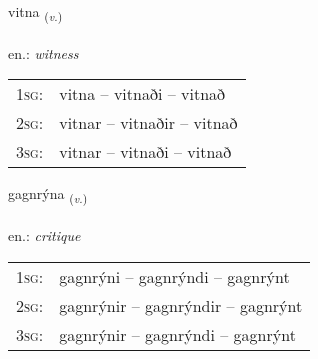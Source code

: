 \documentclass[frontgrid, backgrid]{flacards}\usepackage[]{graphicx}\usepackage[]{xcolor}
\begin{document}
\renewcommand{\flhead}{\vskip5pt \fboxsep=0pt {\small\bfseries\footnotesize Sagnorð | Verb}}
\renewcommand{\fcfoot}{\vskip5pt \fboxsep=0pt \hspace{2pt}{\small\bfseries\footnotesize 2K}}

\renewcommand{\blhead}{\vskip5pt {\small\bfseries\footnotesize Sagnorð | Verb }}
\renewcommand{\bcfoot}{\vskip5pt \hspace{2pt}{\small\bfseries\footnotesize 2K}}


{vitna \small{\textsubscript{(\textit{v.})}} \\[1ex] %
\textphonetic{[vɪhtna]} \\
en.: \emph{witness} \\  [2ex]
\renewcommand*{\arraystretch}{0.8}
\begin{tabular}{p{1cm}l}
\textsc{1sg}: & vitna -- vitnaði -- vitnað \\ 
\textsc{2sg}: & vitnar -- vitnaðir -- vitnað \\ 
\textsc{3sg}: & vitnar -- vitnaði -- vitnað \\ 
\end{tabular}
}

\renewcommand{\flhead}{\vskip5pt \fboxsep=0pt {\small\bfseries\footnotesize Sagnorð | Verb}}
\renewcommand{\fcfoot}{\vskip5pt \fboxsep=0pt \hspace{2pt}{\small\bfseries\footnotesize 2K}}

\renewcommand{\blhead}{\vskip5pt {\small\bfseries\footnotesize Sagnorð | Verb }}
\renewcommand{\bcfoot}{\vskip5pt \hspace{2pt}{\small\bfseries\footnotesize 2K}}


{gagnrýna \small{\textsubscript{(\textit{v.})}} \\[1ex] %
\textphonetic{[kakrina]} \\
en.: \emph{critique} \\  [2ex]
\renewcommand*{\arraystretch}{0.8}
\begin{tabular}{p{1cm}l}
\textsc{1sg}: & gagnrýni -- gagnrýndi -- gagnrýnt \\ 
\textsc{2sg}: & gagnrýnir -- gagnrýndir -- gagnrýnt \\ 
\textsc{3sg}: & gagnrýnir -- gagnrýndi -- gagnrýnt \\ 
\end{tabular}
}
\end{document}

